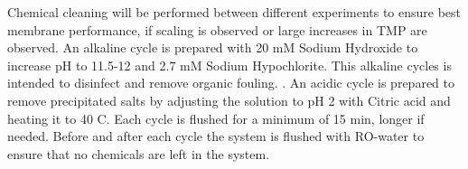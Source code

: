 Chemical cleaning will be performed between different experiments to ensure best membrane performance, if scaling is observed or large increases in TMP are observed. 
An alkaline cycle is prepared with 20 mM Sodium Hydroxide to increase pH to 11.5-12 and 2.7 mM Sodium Hypochlorite.  
This alkaline cycles is intended to disinfect and  remove organic fouling.  \citep{NXfiltration_operation_manual}. 
An acidic cycle is prepared to remove precipitated salts by adjusting the solution to pH 2 with %
Citric acid and heating it to 40 \textdegree{}C. 
Each cycle is flushed for a minimum of 15 min, longer if needed. 
Before and after each cycle the system is flushed with RO-water to ensure that no chemicals are left in the system. 









